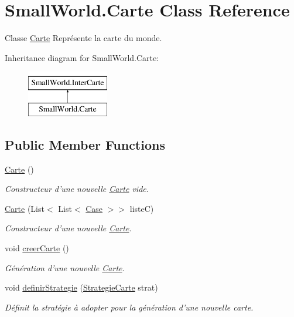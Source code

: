 \hypertarget{class_small_world_1_1_carte}{\section{Small\-World.\-Carte Class Reference}
\label{class_small_world_1_1_carte}
}


Classe \hyperlink{class_small_world_1_1_carte}{Carte} Représente la carte du monde.  


Inheritance diagram for Small\-World.\-Carte\-:\begin{figure}[H]
\begin{center}
\leavevmode
\includegraphics[height=2.000000cm]{class_small_world_1_1_carte}
\end{center}
\end{figure}
\subsection*{Public Member Functions}
\begin{DoxyCompactItemize}
\item 
\hyperlink{class_small_world_1_1_carte_add6995dddd2c8d509abf7a7cb8c4448d}{Carte} ()
\begin{DoxyCompactList}\small\item\em Constructeur d'une nouvelle \hyperlink{class_small_world_1_1_carte}{Carte} vide. \end{DoxyCompactList}\item 
\hyperlink{class_small_world_1_1_carte_a3795b7cf629c8e9151bbb2410bc39eb3}{Carte} (List$<$ List$<$ \hyperlink{class_small_world_1_1_case}{Case} $>$$>$ liste\-C)
\begin{DoxyCompactList}\small\item\em Constructeur d'une nouvelle \hyperlink{class_small_world_1_1_carte}{Carte}. \end{DoxyCompactList}\item 
void \hyperlink{class_small_world_1_1_carte_a412690bcb32264b5282913660c5e38f8}{creer\-Carte} ()
\begin{DoxyCompactList}\small\item\em Génération d'une nouvelle \hyperlink{class_small_world_1_1_carte}{Carte}. \end{DoxyCompactList}\item 
void \hyperlink{class_small_world_1_1_carte_aad692a68904925a11d5307181ca83c5f}{definir\-Strategie} (\hyperlink{class_small_world_1_1_strategie_carte}{Strategie\-Carte} strat)
\begin{DoxyCompactList}\small\item\em Définit la stratégie à adopter pour la génération d'une nouvelle carte. \end{DoxyCompactList}\end{DoxyCompactItemize}
